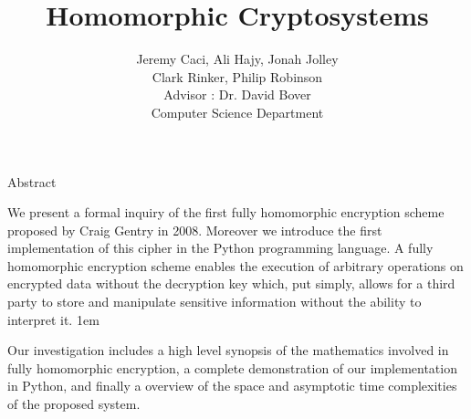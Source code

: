 \documentclass[a0,portrait]{a0poster}
\title{Homomorphic Cryptosystems}
\author{
Jeremy Caci, Ali Hajy, Jonah Jolley\\
Clark Rinker, Philip Robinson\\
Advisor : Dr. David Bover\\
Computer Science Department
}
\begin{document}
\maketitle

\def\fh{{\em Fully Homomorphic}\xspace}

\begin{multicols}{2}
\begin{slide}{Abstract}

We present a formal inquiry of the first fully homomorphic encryption scheme proposed by Craig Gentry in 2008. Moreover we introduce the first implementation of this cipher in the Python programming language. A fully homomorphic encryption scheme enables the execution of arbitrary operations on encrypted data without the decryption key which, put simply, allows for a third party to  store and manipulate sensitive information without the ability to interpret it. 
\parskip 1em

Our investigation includes a high level synopsis of the mathematics involved in fully homomorphic encryption, a complete demonstration of our implementation in Python, and finally a overview of the space and asymptotic time complexities of the proposed system. 


\end{slide}

\end{multicols}
\end{document}
